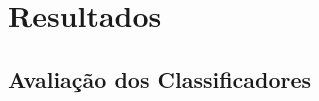 \chapter{Resultados}
\label{resultados}
    \section{Avaliação dos Classificadores}
    \label{avaliacao}